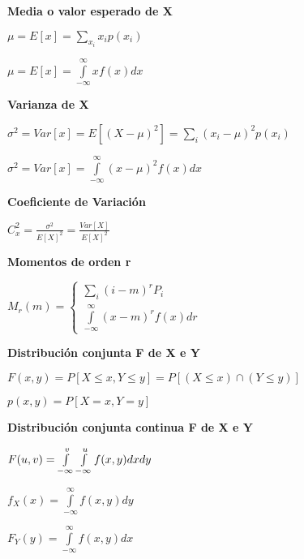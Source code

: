 \begin{minipage}{0.22\textwidth}
	{\bf Media o valor esperado de X}
	\begin{center} $\mu = E[x] = \sum\limits_{x_i} {x_i}{p(x_i)}$\end{center}
	\begin{center} $\mu = E[x] = \int\limits_{-\infty}^{\infty} xf(x)dx$\end{center}
	{\bf Varianza de X}
	\begin{center} $\sigma^2 = Var[x] = E[({X-\mu})^2] = \sum\limits_{i} ({x_i}-{\mu})^2{p(x_i)}$\end{center}
	\begin{center} $\sigma^2 = Var[x] = \int\limits_{-\infty}^{\infty} (x-\mu)^2f(x)dx$\end{center}
	{\bf Coeficiente de Variación}
	\begin{center} $C_x^2 = \frac {\sigma^2}{E[X]^2} = \frac{Var[X]}{E[X]^2}$\end{center}
	{\bf Momentos de orden r}
	\begin{center} $M_r(m) = \left \{  \begin{matrix} \sum\limits_{i} ({i}-{m})^r{P_i} \\
				\int\limits_{-\infty}^{\infty} (x-m)^rf(x)dr\end{matrix}  \right .$\end{center}
\end{minipage}
\vfill\null
\columnbreak
\begin{minipage}{0.22\textwidth}
	{\bf Distribución conjunta F de X e Y}
	\begin{center} $F(x,y) = P[X \le x, Y \le y] = P[(X \le x) \cap  (Y \le y)]$\end{center}
	\begin{center} $p(x,y) = P[X = x, Y = y]$\end{center}
	{\bf Distribución conjunta continua F de X e Y}
	\begin{center} $F(u,v) = \int\limits_{-\infty}^v \int\limits\limits_{-\infty}^u f(x,y)dxdy$\end{center}
	\begin{center} $f_X(x) = \int\limits_{-\infty}^{\infty} f(x,y)dy$\end{center}
	\begin{center} $F_Y(y) = \int\limits_{-\infty}^{\infty} f(x,y)dx$\end{center}
\end{minipage}